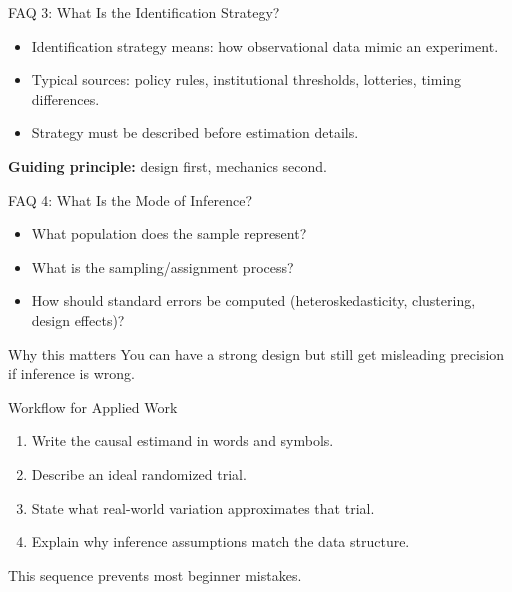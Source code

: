 \documentclass[11pt,aspectratio=169]{beamer}
\begin{document}
\begin{frame}{FAQ 3: What Is the Identification Strategy?}
  \begin{itemize}
    \item Identification strategy means: how observational data mimic an experiment.
    \item Typical sources: policy rules, institutional thresholds, lotteries, timing differences.
    \item Strategy must be described before estimation details.
  \end{itemize}
  \textbf{Guiding principle:} design first, mechanics second.
\end{frame}

\begin{frame}{FAQ 4: What Is the Mode of Inference?}
  \begin{itemize}
    \item What population does the sample represent?
    \item What is the sampling/assignment process?
    \item How should standard errors be computed (heteroskedasticity, clustering, design effects)?
  \end{itemize}
  \begin{block}{Why this matters}
    You can have a strong design but still get misleading precision if inference is wrong.
  \end{block}
\end{frame}

\begin{frame}{Workflow for Applied Work}
  \begin{enumerate}
    \item Write the causal estimand in words and symbols.
    \item Describe an ideal randomized trial.
    \item State what real-world variation approximates that trial.
    \item Explain why inference assumptions match the data structure.
  \end{enumerate}
  \vspace{0.3em}
  This sequence prevents most beginner mistakes.
\end{frame}

\end{document}
